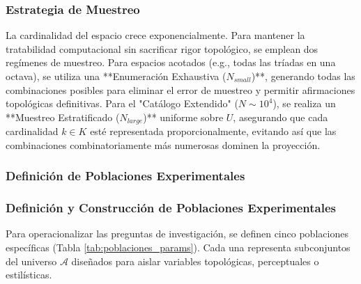 \subsubsection{Estrategia de Muestreo}

La cardinalidad del espacio crece exponencialmente. Para mantener la tratabilidad computacional sin sacrificar rigor topológico, se emplean dos regímenes de muestreo. Para espacios acotados (e.g., todas las tríadas en una octava), se utiliza una **Enumeración Exhaustiva ($N_{small}$)**, generando todas las combinaciones posibles para eliminar el error de muestreo y permitir afirmaciones topológicas definitivas. Para el "Catálogo Extendido" ($N \sim 10^4$), se realiza un **Muestreo Estratificado ($N_{large}$)** uniforme sobre $U$, asegurando que cada cardinalidad $k \in K$ esté representada proporcionalmente, evitando así que las combinaciones combinatoriamente más numerosas dominen la proyección.

\subsubsection{Definición de Poblaciones Experimentales}

\subsubsection{Definición y Construcción de Poblaciones Experimentales}

Para operacionalizar las preguntas de investigación, se definen cinco poblaciones específicas (Tabla \ref{tab:poblaciones_params}). Cada una representa subconjuntos del universo $\mathcal{A}$ diseñados para aislar variables topológicas, perceptuales o estilísticas.

